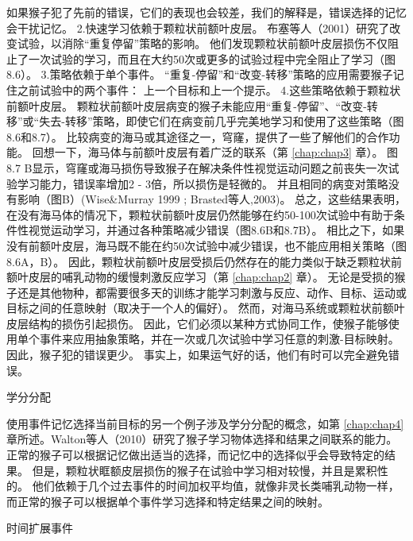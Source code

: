 如果猴子犯了先前的错误，它们的表现也会较差，我们的解释是，错误选择的记忆会干扰记忆。
2.快速学习依赖于颗粒状前额叶皮层。
布塞等人（2001）研究了改变试验，以消除“重复停留”策略的影响。
他们发现颗粒状前额叶皮层损伤不仅阻止了一次试验的学习，而且在大约50次或更多的试验过程中完全阻止了学习（图8.6）。
3.策略依赖于单个事件。
“重复-停留”和“改变-转移”策略的应用需要猴子记住之前试验中的两个事件：
上一个目标和上一个提示。
4.这些策略依赖于颗粒状前额叶皮层。
颗粒状前额叶皮层病变的猴子未能应用“重复-停留”、“改变-转移”或“失去-转移”策略，即使它们在病变前几乎完美地学习和使用了这些策略（图8.6和8.7）。
比较病变的海马或其途径之一，穹窿，提供了一些了解他们的合作功能。
回想一下，海马体与前额叶皮层有着广泛的联系（第 \ref{chap:chap3} 章）。
图8.7 B显示，穹窿或海马损伤导致猴子在解决条件性视觉运动问题之前丧失一次试验学习能力，错误率增加2 - 3倍，所以损伤是轻微的。
并且相同的病变对策略没有影响（图B）(Wise\&Murray 1999 ; Brasted等人,2003)。
总之，这些结果表明，在没有海马体的情况下，颗粒状前额叶皮层仍然能够在约50-100次试验中有助于条件性视觉运动学习，并通过各种策略减少错误（图8.6B和8.7B）。
相比之下，如果没有前额叶皮层，海马既不能在约50次试验中减少错误，也不能应用相关策略（图8.6A，B）。
因此，颗粒状前额叶皮层受损后仍然存在的能力类似于缺乏颗粒状前额叶皮层的哺乳动物的缓慢刺激反应学习（第 \ref{chap:chap2} 章）。
无论是受损的猴子还是其他物种，都需要很多天的训练才能学习刺激与反应、动作、目标、运动或目标之间的任意映射（取决于一个人的偏好）。
然而，对海马系统或颗粒状前额叶皮层结构的损伤引起损伤。
因此，它们必须以某种方式协同工作，使猴子能够使用单个事件来应用抽象策略，并在一次或几次试验中学习任意的刺激-目标映射。
因此，猴子犯的错误更少。
事实上，如果运气好的话，他们有时可以完全避免错误。



学分分配

使用事件记忆选择当前目标的另一个例子涉及学分分配的概念，如第 \ref{chap:chap4} 章所述。Walton等人（2010）研究了猴子学习物体选择和结果之间联系的能力。
正常的猴子可以根据记忆做出适当的选择，而记忆中的选择似乎会导致特定的结果。
但是，颗粒状眶额皮层损伤的猴子在试验中学习相对较慢，并且是累积性的。
他们依赖于几个过去事件的时间加权平均值，就像非灵长类哺乳动物一样，而正常的猴子可以根据单个事件学习选择和特定结果之间的映射。



时间扩展事件

